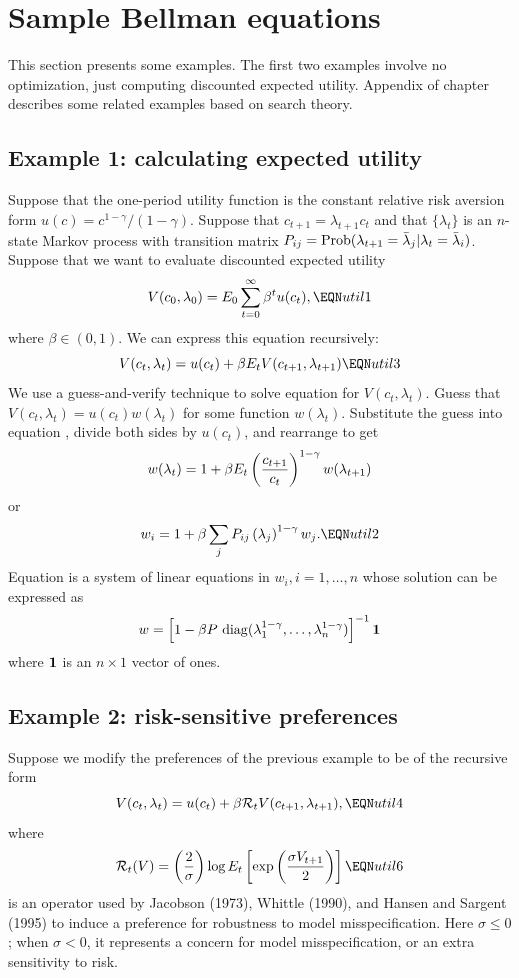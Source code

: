 \section{Sample Bellman equations}
This section presents some examples.  The first two examples
involve no optimization, just  computing discounted expected utility.
Appendix  of chapter  describes some related examples based
on search theory.

\subsection{Example 1: calculating expected utility}
 Suppose that the one-period utility function is the constant relative
risk  aversion form
$ u(c) = c^{1-\gamma}/(1-\gamma)$.   Suppose that
$c_{t+1} = \lambda_{t+1} c_t$ and that $\{\lambda_t\}$
is an $n$-state Markov process
 with transition matrix $P_{ij} = {\rm Prob} (\lambda_{t+1} =
\bar \lambda_j \vert \lambda_t = \bar \lambda_i)$.    Suppose
that we want to evaluate     discounted expected
utility
$$ V(c_0, \lambda_0) = E_0 \sum_{t=0}^\infty \beta^t u(c_t), \EQN util1 $$
where $\beta \in (0,1)$.
We can express this equation recursively:
$$ V(c_t, \lambda_t) = u(c_t) + \beta
 E_t  V(c_{t+1}, \lambda_{t+1}) \EQN util3$$
    We use a guess-and-verify
technique to solve equation  for $V(c_t,\lambda_t)$.   Guess
that $V(c_t,\lambda_t) = u(c_t) w(\lambda_t)$ for some
function $w(\lambda_t)$. Substitute the  guess into
equation , divide both sides by $u(c_t)$, and rearrange to
get
$$ w(\lambda_t) = 1   + \beta E_t \left({c_{t+1} \over c_t}\right)^{1-\gamma}
                  w(\lambda_{t+1}) $$
or
$$ w_i = 1 + \beta \sum_j P_{ij} \left(\lambda_j\right)^{1-\gamma} w_j.
    \EQN util2 $$
Equation  is a system of linear equations
in  $w_i, i=1, \ldots , n$ whose solution can be expressed
as
$$ w = \left[1-\beta P \ {\rm diag}(\lambda_1^{1-\gamma}, \ldots, \lambda_n^{1-\gamma})\right]^{-1}
  {\bf 1} $$
  where ${\bf 1}$ is an $n\times 1$ vector of ones.


\subsection{Example 2: risk-sensitive preferences}

   Suppose we modify the preferences of the previous example to
be of the recursive form
$$ V(c_t, \lambda_t) = u(c_t) +\beta {\cal R}_t V(c_{t+1}, \lambda_{t+1}),
 \EQN util4 $$
where $${\cal R}_t(V) = \left({2 \over \sigma}\right) \log E_t
\left[ \exp\left({\sigma V_{t+1} \over 2} \right) \right] \EQN
util6 $$ is an operator used by Jacobson (1973), Whittle (1990),
and Hansen and Sargent (1995) to induce a preference for
robustness to model misspecification.  Here $\sigma\leq 0$; when $\sigma < 0$, it represents
a concern for model misspecification, or an extra sensitivity to
risk.


